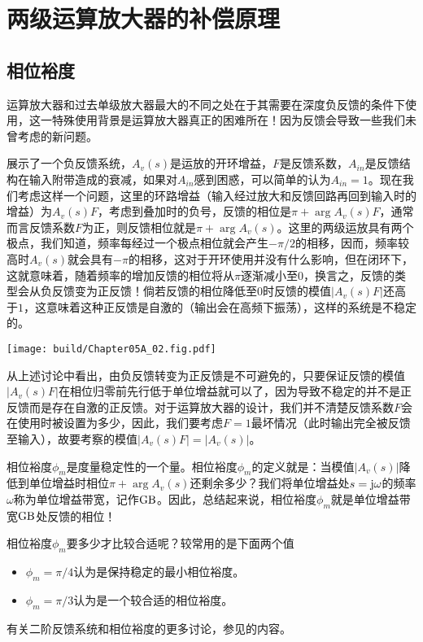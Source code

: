 \section{两级运算放大器的补偿原理}

\subsection{相位裕度}
运算放大器和过去单级放大器最大的不同之处在于其需要在深度负反馈的条件下使用，这一特殊使用背景是运算放大器真正的困难所在！因为反馈会导致一些我们未曾考虑的新问题。

展示了一个负反馈系统，$A_v(s)$是运放的开环增益，$F$是反馈系数，$A_{in}$是反馈结构在输入附带造成的衰减，如果对$A_{in}$感到困惑，可以简单的认为$A_{in}=1$。现在我们考虑这样一个问题，这里的环路增益（输入经过放大和反馈回路再回到输入时的增益）为$A_v(s)F$，考虑到叠加时的负号，反馈的相位是$\pi+\arg A_v(s)F$，通常而言反馈系数$F$为正，则反馈相位就是$\pi+\arg A_v(s)$。这里的两级运放具有两个极点，我们知道，频率每经过一个极点相位就会产生$-\pi/2$的相移，因而，频率较高时$A_v(s)$就会具有$-\pi$的相移，这对于开环使用并没有什么影响，但在闭环下，这就意味着，随着频率的增加反馈的相位将从$\pi$逐渐减小至$0$，换言之，反馈的类型会从负反馈变为正反馈！倘若反馈的相位降低至$0$时反馈的模值$|A_v(s)F|$还高于$1$，这意味着这种正反馈是自激的（输出会在高频下振荡），这样的系统是不稳定的。

\begin{Figure}[反馈的框图]
    \texttt{[image: build/Chapter05A\_02.fig.pdf]}
\end{Figure}


从上述讨论中看出，由负反馈转变为正反馈是不可避免的，只要保证反馈的模值$|A_v(s)F|$在相位归零前先行低于单位增益就可以了，因为导致不稳定的并不是正反馈而是存在自激的正反馈。对于运算放大器的设计，我们并不清楚反馈系数$F$会在使用时被设置为多少，因此，我们要考虑$F=1$最坏情况（此时输出完全被反馈至输入），故要考察的模值$|A_v(s)F|=|A_v(s)|$。

相位裕度$\phi_m$是度量稳定性的一个量。相位裕度$\phi_m$的定义就是：当模值$|A_v(s)|$降低到单位增益时相位$\pi+\arg A_v(s)$还剩余多少？我们将单位增益处$s=\mathrm{j}\omega$的频率$\omega$称为单位增益带宽，记作$\text{GB}$。因此，总结起来说，相位裕度$\phi_m$就是单位增益带宽$\text{GB}$处反馈的相位！

相位裕度$\phi_m$要多少才比较合适呢？较常用的是下面两个值
\begin{itemize}
    \item $\phi_m=\pi/4$认为是保持稳定的最小相位裕度。
    \item $\phi_m=\pi/3$认为是一个较合适的相位裕度。
\end{itemize}
有关二阶反馈系统和相位裕度的更多讨论，参见的内容。

